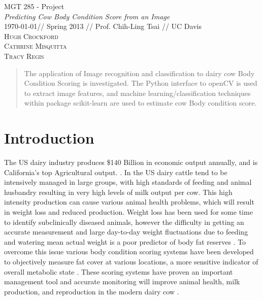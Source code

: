 \documentclass[11pt]{article}
\begin{document}
\begin{center}
	\vspace*{0.3in}
	\LARGE MGT 285 - Project \\ 
	\Large \emph{Predicting Cow Body Condition Score from an Image} \\ 
	\vspace{0.25in}
	\normalsize \today  // Spring 2013 // Prof. Chih-Ling Tsai // UC Davis\\ 
	\vspace{0.25in}
	\textsc{Hugh Crockford\\Cathrine Misquitta\\Tracy Regis}
	\vspace{0.1in}
\end{center}


	\tableofcontents

	\renewcommand{\abstractname}{Executive Summary}
	\begin{abstract}
		The application of Image recognition and classification to dairy cow Body Condition Scoring is investigated.
		The Python interface to openCV is used to extract image features, and machine learning/classification techniques within package scikit-learn are used to estimate cow Body condition score.
	\end{abstract}

\newpage
\section{Introduction}
		The US dairy industry produces \$140 Billion in economic output annually, and is California's top Agricultural output. \cite{cmab13}. 
		In the US dairy cattle tend to be intensively managed in large groups, with high standards of feeding and animal husbandry resulting in very high levels of milk output per cow.
		This high intensity production can cause various animal health problems, which will result in weight loss and reduced production.
		Weight loss has been used for some time to identify subclinically diseased animals, however the difficulty in getting an accurate measurement and large day-to-day weight fluctuations due to feeding and watering mean actual weight is a poor predictor of body fat reserves \cite{Roche2004}.
		To overcome this issue various body condition scoring systems have been developed to objectively measure fat cover at various locations, a more sensitive indicator of overall metabolic state \cite{Wildman1982}.
		These scoring systems have proven an important management tool and accurate monitoring will improve animal health, milk production, and reproduction in the modern dairy cow \cite{Buckley2003}.
\end{document}

